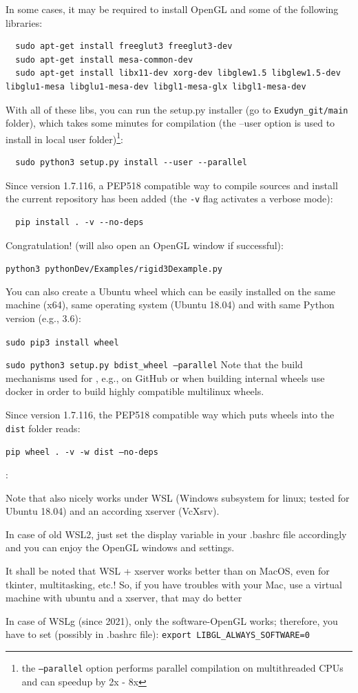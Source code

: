 In some cases, it may be required to install OpenGL and some of the following libraries:
\begin{lstlisting}
  sudo apt-get install freeglut3 freeglut3-dev
  sudo apt-get install mesa-common-dev
  sudo apt-get install libx11-dev xorg-dev libglew1.5 libglew1.5-dev libglu1-mesa libglu1-mesa-dev libgl1-mesa-glx libgl1-mesa-dev
\end{lstlisting}

\noindent 
With all of these libs, you can run the setup.py installer (go to \texttt{Exudyn\_git/main} folder), which takes some minutes for compilation (the --user option is used to install in local user folder)\footnote{the \texttt{--parallel} option performs parallel compilation on multithreaded CPUs and can speedup by 2x - 8x}:
\begin{lstlisting}
  sudo python3 setup.py install --user --parallel
\end{lstlisting}
Since version 1.7.116, a PEP518 compatible way to compile sources and install the current repository has been added (the \texttt{-v} flag activates a verbose mode):
\begin{lstlisting}
  pip install . -v --no-deps
\end{lstlisting}

\noindent 
Congratulation!  (will also open an OpenGL window if successful):
\bi
  \item[] \texttt{python3 pythonDev/Examples/rigid3Dexample.py}
\ei

\noindent You can also create a Ubuntu wheel which can be easily installed on the same machine (x64), same operating system (Ubuntu 18.04) and with same Python version (e.g., 3.6):
\bi
  \item[] \texttt{sudo pip3 install wheel}
  \item[] \texttt{sudo python3 setup.py bdist\_wheel --parallel}
\ei
Note that the build mechanisms used for \codeName, e.g., on GitHub or when building internal wheels use docker in order to build highly compatible multilinux wheels.

\noindent Since version 1.7.116, the PEP518 compatible way which puts wheels into the \texttt{dist} folder reads:
\bi
  \item[] \texttt{pip wheel . -v -w dist --no-deps}
\ei


\noindent {}:
\bi
  \item Note that \codeName also nicely works under WSL (Windows subsystem for linux; tested for Ubuntu 18.04) and an according xserver (VcXsrv).
  \item In case of old WSL2, just set the display variable in your .bashrc file accordingly and you can enjoy the OpenGL windows and settings.
  \item It shall be noted that WSL + xserver works better than on MacOS, even for tkinter, multitasking, etc.! So, if you have troubles with your Mac, use a virtual machine with ubuntu and a xserver, that may do better
  \item In case of WSLg (since 2021), only the software-OpenGL works; therefore, you have to set (possibly in .bashrc file): \texttt{export LIBGL\_ALWAYS\_SOFTWARE=0}
\ei

